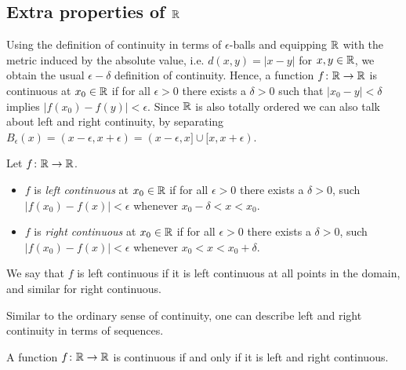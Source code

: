 \documentclass{article}
\begin{document}
\subsection{Extra properties of ${\mathbb{R}}$}

Using the definition of continuity in terms of $\epsilon$-balls and equipping ${\mathbb{R}}$ with the metric induced by the absolute value, i.e. $d(x,y) = \vert x- y\vert$ for $x,y\in {\mathbb{R}}$, we obtain the usual $\epsilon-\delta$ definition of continuity. Hence, a function $f\colon {\mathbb{R}} \to {\mathbb{R}}$ is continuous at $x_0\in {\mathbb{R}}$ if for all $\epsilon>0$ there exists a $\delta>0$ such that $\vert x_0-y\vert <\delta$ implies $\vert f(x_0)-f(y)\vert<\epsilon$. Since ${\mathbb{R}}$ is also totally ordered we can also talk about left and right continuity, by separating $B_\epsilon(x) = (x-\epsilon, x+ \epsilon) = (x-\epsilon, x] \cup [x, x+\epsilon)$.

\begin{definition} Let $f\colon {\mathbb{R}} \to {\mathbb{R}}$.
\begin{itemize}
    \item $f$ is \emph{left continuous} at $x_0\in {\mathbb{R}}$ if for all $\epsilon >0$ there exists a $\delta>0$, such $\vert f(x_0)-f(x)\vert<\epsilon$ whenever $ x_0-\delta <x<x_0$.
    \item $f$ is \emph{right continuous} at $x_0\in {\mathbb{R}}$ if for all $\epsilon >0$ there exists a $\delta>0$, such $\vert f(x_0)-f(x)\vert<\epsilon$ whenever $x_0<x<x_0+\delta$.
\end{itemize}
We say that $f$ is left continuous if it is left continuous at all points in the domain, and similar for right continuous.
\end{definition}

Similar to the ordinary sense of continuity, one can describe left and right continuity in terms of sequences. 

\begin{proposition}
 A function $f\colon {\mathbb{R}} \to {\mathbb{R}}$ is continuous if and only if it is left and right continuous. 
\end{proposition}
\end{document}
